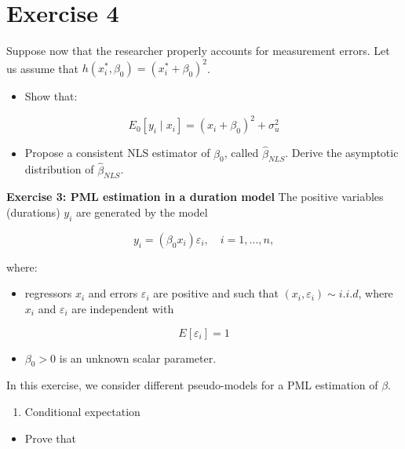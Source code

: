 \section{Exercise 4}
\label{sec:sec4}
Suppose now that the researcher properly accounts for measurement errors. Let us assume that $h\left(x_{i}^{*}, \beta_{0}\right)=\left(x_{i}^{*}+\beta_{0}\right)^{2}$.

\begin{itemize}
  \item Show that:
\end{itemize}

$$
E_{0}\left[y_{i} \mid x_{i}\right]=\left(x_{i}+\beta_{0}\right)^{2}+\sigma_{u}^{2}
$$

\begin{itemize}
  \item Propose a consistent NLS estimator of $\beta_{0}$, called $\hat{\beta}_{N L S}$. Derive the asymptotic distribution of $\hat{\beta}_{N L S}$.
\end{itemize}

\textbf{Exercise 3: PML estimation in a duration model}
The positive variables (durations) $y_{i}$ are generated by the model

$$
y_{i}=\left(\beta_{0} x_{i}\right) \varepsilon_{i}, \quad i=1, \ldots, n,
$$

where:

\begin{itemize}
  \item regressors $x_{i}$ and errors $\varepsilon_{i}$ are positive and such that $\left(x_{i}, \varepsilon_{i}\right) \sim i . i . d$, where $x_{i}$ and $\varepsilon_{i}$ are independent with
\end{itemize}

$$
E\left[\varepsilon_{i}\right]=1
$$

\begin{itemize}
  \item $\beta_{0}>0$ is an unknown scalar parameter.
\end{itemize}

In this exercise, we consider different pseudo-models for a PML estimation of $\beta$.

\begin{enumerate}
  \item Conditional expectation
\end{enumerate}

\begin{itemize}
  \item Prove that
\end{itemize}

